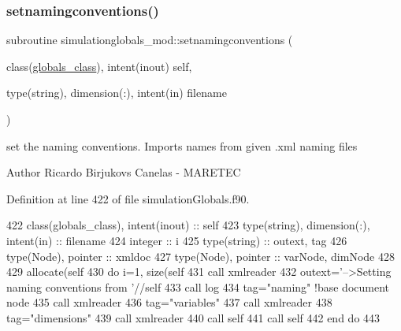 \subsubsection{\texorpdfstring{setnamingconventions()}{setnamingconventions()}}
{\footnotesize\ttfamily subroutine simulationglobals\+\_\+mod\+::setnamingconventions (\begin{DoxyParamCaption}\item[{class(\mbox{\hyperlink{structsimulationglobals__mod_1_1globals__class}{globals\+\_\+class}}), intent(inout)}]{self,  }\item[{type(string), dimension(\+:), intent(in)}]{filename }\end{DoxyParamCaption})\hspace{0.3cm}{\ttfamily [private]}}



set the naming conventions. Imports names from given .xml naming files 

\begin{DoxyAuthor}{Author}
Ricardo Birjukovs Canelas -\/ M\+A\+R\+E\+T\+EC 
\end{DoxyAuthor}


Definition at line 422 of file simulation\+Globals.\+f90.


\begin{DoxyCode}
422     \textcolor{keywordtype}{class}(globals\_class), \textcolor{keywordtype}{intent(inout)} :: self
423     \textcolor{keywordtype}{type}(string), \textcolor{keywordtype}{dimension(:)}, \textcolor{keywordtype}{intent(in)} :: filename
424     \textcolor{keywordtype}{integer} :: i
425     \textcolor{keywordtype}{type}(string) :: outext, tag
426     \textcolor{keywordtype}{type}(Node), \textcolor{keywordtype}{pointer} :: xmldoc
427     \textcolor{keywordtype}{type}(Node), \textcolor{keywordtype}{pointer} :: varNode, dimNode
428 
429     \textcolor{keyword}{allocate}(self%
430     \textcolor{keywordflow}{do} i=1, \textcolor{keyword}{size}(self%
431         \textcolor{keyword}{call }xmlreader%
432         outext=\textcolor{stringliteral}{'-->Setting naming conventions from '}//self%
433         \textcolor{keyword}{call }log%
434         tag=\textcolor{stringliteral}{"naming"}          \textcolor{comment}{!base document node}
435         \textcolor{keyword}{call }xmlreader%
436         tag=\textcolor{stringliteral}{"variables"}
437         \textcolor{keyword}{call }xmlreader%
438         tag=\textcolor{stringliteral}{"dimensions"}
439         \textcolor{keyword}{call }xmlreader%
440         \textcolor{keyword}{call }self%
441         \textcolor{keyword}{call }self%
442 \textcolor{keywordflow}{    end do}
443 
\end{DoxyCode}
\mbox{\label{namespacesimulationglobals__mod_ada0b6ffc5e112afbd86cdaa8d9aa55d8}} 
